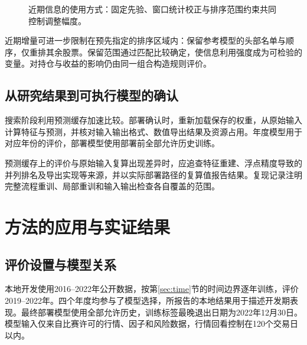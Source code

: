 \documentclass[UTF8,11pt,a4paper,fontset=fandol]{ctexart}
\newenvironment{methodfigure}{\begin{figure}[!htbp]}{\end{figure}}
\begin{document}
\begin{methodfigure}\centering
{}
\caption{近期信息的使用方式：固定先验、窗口统计校正与排序范围约束共同控制调整幅度。}\label{fig:adaptation}
\end{methodfigure}

近期增量可进一步限制在预先指定的排序区域内：保留参考模型的头部名单与顺序，仅重排其余股票。保留范围通过匹配比较确定，使信息利用强度成为可检验的变量。对持仓与收益的影响仍由同一组合构造规则评价。

\subsection{从研究结果到可执行模型的确认}\label{sec:deployment}
搜索阶段利用预测缓存加速比较。部署确认时，重新加载保存的权重，从原始输入计算特征与预测，并核对输入输出格式、数值导出结果及资源占用。年度模型用于对应年份的评价，部署模型使用部署前全部允许历史训练。

预测缓存上的评价与原始输入复算出现差异时，应追查特征重建、浮点精度导致的并列排名及导出实现等来源，并以实际部署路径的复算值报告结果。复现记录注明完整流程重训、局部重训和输入输出检查各自覆盖的范围。


\section{方法的应用与实证结果}\label{sec:experiments}
\subsection{评价设置与模型关系}
本地开发使用2016--2022年公开数据，按第\ref{sec:time}节的时间边界逐年训练，评价2019--2022年。四个年度均参与了模型选择，所报告的本地结果用于描述开发期表现。最终部署模型使用全部允许历史，训练标签最晚退出日期为2022年12月30日。模型输入仅来自比赛许可的行情、因子和风险数据，行情回看控制在120个交易日以内。
\end{document}
